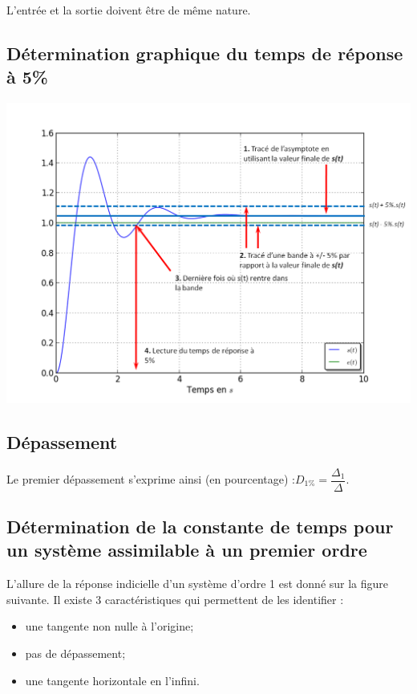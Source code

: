 \documentclass[11pt,oneside]{article}
\begin{document}
{\begin{minipage}[t]{.48\linewidth}
L'entrée et la sortie doivent être de même nature.
\end{minipage}





\subsection*{Détermination graphique du temps de réponse à 5\%}

\begin{center}
\includegraphics[width=.8\textwidth]{png/tr5.png}
\end{center}

\subsection*{Dépassement}

Le premier dépassement s'exprime ainsi (en pourcentage) :$D_{1\%}=\dfrac{\Delta_1}{\Delta}$.


\subsection*{Détermination de la constante de temps pour un système assimilable à un premier ordre}
\vspace{.5cm}

L'allure de la réponse indicielle d'un système d'ordre 1 est donné sur la figure suivante. Il existe 3 caractéristiques qui permettent de les identifier : 
\begin{itemize}
\item une tangente non nulle à l'origine;
\item pas de dépassement;
\item une tangente horizontale en l'infini.
\end{itemize}

}
\end{document}
